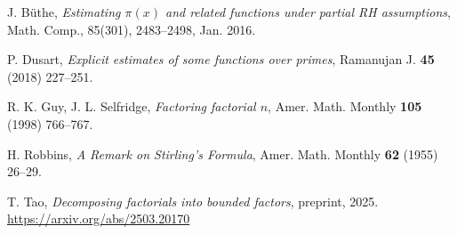 \documentclass[12pt,a4paper,reqno]{amsart}
\numberwithin{equation}{section}
\theoremstyle{plain}
\theoremstyle{definition}
\begin{document}
\begin{thebibliography}{10}

J. B\"uthe, \emph{Estimating $\pi(x)$ and related functions under partial RH assumptions}, Math. Comp., 85(301), 2483--2498, Jan. 2016.

P. Dusart, \emph{Explicit estimates of some functions over primes}, Ramanujan J. \textbf{45} (2018) 227--251.

R. K. Guy, J. L. Selfridge, \emph{Factoring factorial $n$}, Amer. Math. Monthly \textbf{105} (1998) 766--767.

H. Robbins, \emph{A Remark on Stirling's Formula}, Amer. Math. Monthly \textbf{62} (1955) 26--29.

T. Tao, \emph{Decomposing factorials into bounded factors}, preprint, 2025. \url{https://arxiv.org/abs/2503.20170}

\end{thebibliography}
\end{document}
